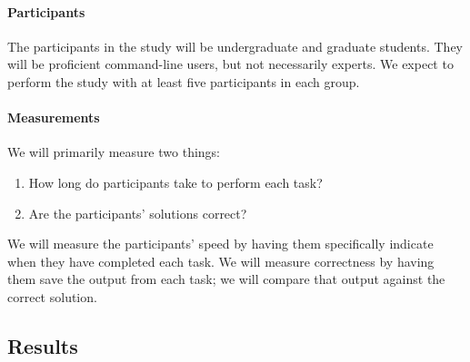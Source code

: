 \paragraph{Participants} The participants in the study will be undergraduate and
graduate students. They will be proficient command-line users, but not
necessarily experts. We expect to perform the study with at least five
participants in each group.

\paragraph{Measurements} We will primarily measure two things:
\begin{enumerate}\itemsep-1pt
    \item How long do participants take to perform each task?
    \item Are the participants' solutions correct?
\end{enumerate}
We will measure the participants' speed by having them specifically indicate
when they have completed each task. We will measure correctness by having them
save the output from each task; we will compare that output against the correct
solution.

\subsection{Results}

